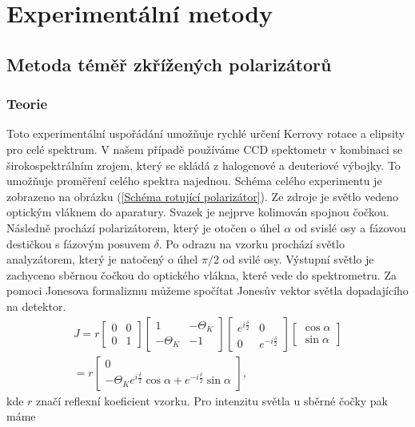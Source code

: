 \chapter{Experimentální metody}

\section{Metoda téměř zkřížených polarizátorů}
\subsection{Teorie}
Toto experimentální uspořádání umožňuje rychlé určení Kerrovy rotace a elipsity pro celé spektrum. V našem případě používáme CCD spektometr v kombinaci se širokospektrálním zrojem, který se skládá z halogenové a deuteriové výbojky. To umožňuje proměření celého spektra najednou. Schéma celého experimentu je zobrazeno na obrázku (\ref{Schéma rotující polarizátor}). Ze zdroje je světlo vedeno optickým vláknem do aparatury. Svazek je nejprve kolimován spojnou čočkou. Následně prochází polarizátorem, který je otočen o úhel $\alpha$ od svislé osy a fázovou destičkou s fázovým posuvem $\delta$. Po odrazu na vzorku prochází světlo analyzátorem, který je natočený o úhel $\pi/2$ od svilé osy. Výstupní světlo je zachyceno sběrnou čočkou do optického vlákna, které vede do spektrometru. Za pomoci Jonesova formalizmu můžeme spočítat Jonesův vektor světla dopadajícího na detektor.
\begin{eqnarray}
J=r\begin{bmatrix}0&0\\0&1\end{bmatrix}\begin{bmatrix}1&-\Theta_K\\-\Theta_K&-1\end{bmatrix}\begin{bmatrix}e^{i\frac{\delta}{2}}&0\\0&e^{-i\frac{\delta}{2}}\end{bmatrix}\begin{bmatrix}\cos\alpha\\\sin\alpha\end{bmatrix}\\
=r\begin{bmatrix}0\\-\Theta_Ke^{i\frac{\delta}{2}}\cos\alpha+e^{-i\frac{\delta}{2}}\sin\alpha\end{bmatrix},
\end{eqnarray}
kde $r$ značí reflexní koeficient vzorku. Pro intenzitu světla u sběrné čočky pak máme
